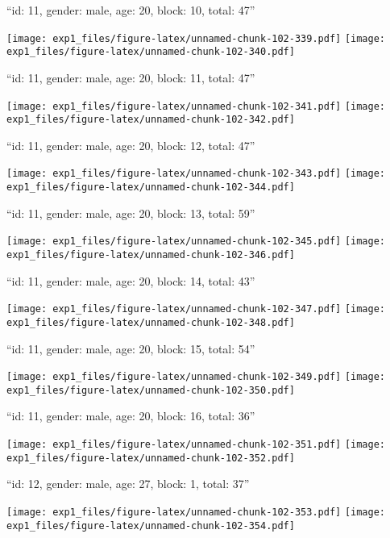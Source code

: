 \documentclass[11pt,,]{article}
\begin{document}
\newpage
[1] 

``id: 11, gender: male, age: 20, block: 10, total: 47''

\texttt{[image: exp1\_files/figure-latex/unnamed-chunk-102-339.pdf]}
\texttt{[image: exp1\_files/figure-latex/unnamed-chunk-102-340.pdf]}

\newpage
[1] 

``id: 11, gender: male, age: 20, block: 11, total: 47''

\texttt{[image: exp1\_files/figure-latex/unnamed-chunk-102-341.pdf]}
\texttt{[image: exp1\_files/figure-latex/unnamed-chunk-102-342.pdf]}

\newpage
[1] 

``id: 11, gender: male, age: 20, block: 12, total: 47''

\texttt{[image: exp1\_files/figure-latex/unnamed-chunk-102-343.pdf]}
\texttt{[image: exp1\_files/figure-latex/unnamed-chunk-102-344.pdf]}

\newpage
[1] 

``id: 11, gender: male, age: 20, block: 13, total: 59''

\texttt{[image: exp1\_files/figure-latex/unnamed-chunk-102-345.pdf]}
\texttt{[image: exp1\_files/figure-latex/unnamed-chunk-102-346.pdf]}

\newpage
[1] 

``id: 11, gender: male, age: 20, block: 14, total: 43''

\texttt{[image: exp1\_files/figure-latex/unnamed-chunk-102-347.pdf]}
\texttt{[image: exp1\_files/figure-latex/unnamed-chunk-102-348.pdf]}

\newpage
[1] 

``id: 11, gender: male, age: 20, block: 15, total: 54''

\texttt{[image: exp1\_files/figure-latex/unnamed-chunk-102-349.pdf]}
\texttt{[image: exp1\_files/figure-latex/unnamed-chunk-102-350.pdf]}

\newpage
[1] 

``id: 11, gender: male, age: 20, block: 16, total: 36''

\texttt{[image: exp1\_files/figure-latex/unnamed-chunk-102-351.pdf]}
\texttt{[image: exp1\_files/figure-latex/unnamed-chunk-102-352.pdf]}

\newpage
[1] 

``id: 12, gender: male, age: 27, block: 1, total: 37''

\texttt{[image: exp1\_files/figure-latex/unnamed-chunk-102-353.pdf]}
\texttt{[image: exp1\_files/figure-latex/unnamed-chunk-102-354.pdf]}
\end{document}
